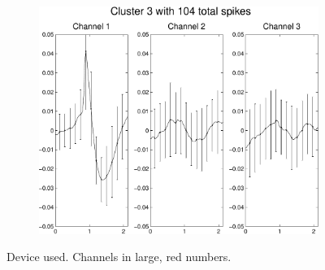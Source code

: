 \documentclass{article} %
\begin{document}
\begin{center}
\begin{figure}
\begin{subfigure}[b]{.24\textwidth}
\caption{}
\end{subfigure}
\begin{subfigure}[b]{.24\textwidth}
\includegraphics[width=\textwidth]{../figs/3devim/clus3}
\caption{}
\end{subfigure}
\caption{Device used. Channels in large, red numbers.}
\end{figure}
\end{center}


\end{document}
